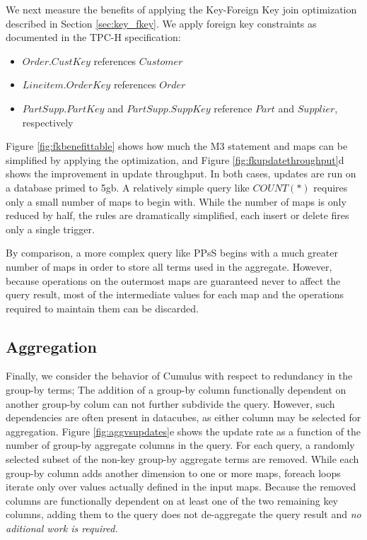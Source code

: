 We next measure the benefits of applying the Key-Foreign Key join optimization described in Section \ref{sec:key_fkey}.  We apply foreign key constraints as documented in the TPC-H specification: 
\begin{itemize}
\item $Order.CustKey$ references $Customer$
\item $Lineitem.OrderKey$ references $Order$
\item $PartSupp.PartKey$ and $PartSupp.SuppKey$ reference $Part$ and $Supplier$, respectively

\end{itemize}

Figure \ref{fig:fkbenefittable} shows how much the M3 statement and maps can be simplified by applying the optimization, and Figure \ref{fig:fkupdatethroughput}d shows the improvement in update throughput.  In both cases, updates are run on a database primed to 5gb.  A relatively simple query like $COUNT(*)$ requires only a small number of maps to begin with.  While the number of maps is only reduced by half, the rules are dramatically simplified, each insert or delete fires only a single trigger.

By comparison, a more complex query like PPsS begins with a much greater number of maps in order to store all terms used in the aggregate.  However, because operations on the outermost maps are guaranteed never to affect the query result, most of the intermediate values for each map and the operations required to maintain them can be discarded.

\subsection{Aggregation}

Finally, we consider the behavior of Cumulus with respect to redundancy in the group-by terms; The addition of a group-by column functionally dependent on another group-by colum can not further subdivide the query.  However, such dependencies are often present in datacubes, as either column may be selected for aggregation.  Figure \ref{fig:aggvsupdates}e shows the update rate as a function of the number of group-by aggregate columns in the query.  For each query, a randomly selected subset of the non-key group-by aggregate terms are removed.  While each group-by column adds another dimension to one or more maps, foreach loops iterate only over values actually defined in the input maps.  Because the removed columns are functionally dependent on at least one of the two remaining key columns, adding them to the query does not de-aggregate the query result and \textit{no aditional work is required.}  

